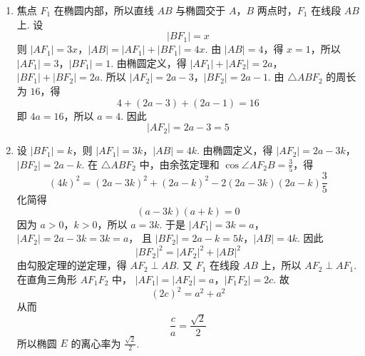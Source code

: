 \begin{solution}
\begin{enumerate}
\item 焦点 \(F_1\) 在椭圆内部，所以直线 \(AB\) 与椭圆交于 \(A\)，\(B\) 两点时，\(F_1\) 在线段 \(AB\) 上. 设
\[
|BF_1|=x
\]
则
\(|AF_1|=3x\)，\(|AB|=|AF_1|+|BF_1|=4x\).
由 \(|AB|=4\)，得 \(x=1\)，所以
\(|AF_1|=3\)，\(|BF_1|=1\).
由椭圆定义，得
\(|AF_1|+|AF_2|=2a\)，\(|BF_1|+|BF_2|=2a\).
所以
\(|AF_2|=2a-3\)，\(|BF_2|=2a-1\).
由 \(\triangle ABF_2\) 的周长为 \(16\)，得
\[
4+(2a-3)+(2a-1)=16
\]
即 \(4a=16\)，所以 \(a=4\). 因此
\[
|AF_2|=2a-3=5
\]

\item 设 \(|BF_1|=k\)，则
\(|AF_1|=3k\)，\(|AB|=4k\).
由椭圆定义，得
\(|AF_2|=2a-3k\)，\(|BF_2|=2a-k\).
在 \(\triangle ABF_2\) 中，由余弦定理和 \(\cos\angle AF_2B=\frac{3}{5}\)，得
\[
(4k)^2=(2a-3k)^2+(2a-k)^2-2(2a-3k)(2a-k)\frac{3}{5}
\]
化简得
\[
(a-3k)(a+k)=0
\]
因为 \(a>0\)，\(k>0\)，所以 \(a=3k\). 于是
\(|AF_1|=3k=a\)，\(|AF_2|=2a-3k=3k=a\)，
且
\(|BF_2|=2a-k=5k\)，\(|AB|=4k\).
因此
\[
|BF_2|^2=|AF_2|^2+|AB|^2
\]
由勾股定理的逆定理，得 \(AF_2\perp AB\). 又 \(F_1\) 在线段 \(AB\) 上，所以 \(AF_2\perp AF_1\). 在直角三角形 \(AF_1F_2\) 中，
\(|AF_1|=|AF_2|=a\)，\(|F_1F_2|=2c\).
故
\[
(2c)^2=a^2+a^2
\]
从而
\[
\frac{c}{a}=\frac{\sqrt{2}}{2}
\]
所以椭圆 \(E\) 的离心率为 \(\frac{\sqrt{2}}{2}\).
\end{enumerate}
\end{solution}

